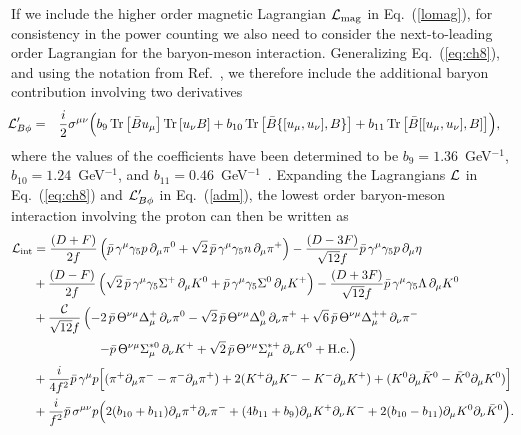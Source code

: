 \documentclass[preprintnumbers,prd,superscriptaddress,preprint]{revtex4-1}
\begin{document}
If we include the higher order magnetic Lagrangian ${\cal L}_{\rm mag}$ in Eq.~(\ref{lomag}), for consistency in the power counting we also need to consider the next-to-leading order Lagrangian for the baryon-meson interaction.
Generalizing Eq.~(\ref{eq:ch8}), and using the notation from Ref.~\cite{Kubis:2000aa}, we therefore include the additional baryon contribution involving two derivatives~\cite{Kubis:2000aa}
%
\begin{eqnarray}
\label{adm}
\!\!{\cal L}_{B\phi}' &=& \frac{i}{2}\sigma^{\mu\nu} 
\Big( 
  b_9\, {\rm Tr} \left[\bar{B}u_\mu\right]{\rm Tr}\left[u_\nu B\right]
+ b_{10}\, {\rm Tr} \left[\bar{B}\{[u_\mu,u_\nu],B\}\right]
+ b_{11}\, {\rm Tr} \left[\bar{B}[[u_\mu,u_\nu],B]\right]\!
\Big),~~~
\end{eqnarray}
%
where the values of the coefficients have been determined to be
    $b_9=1.36$~GeV$^{-1}$,
    $b_{10}=1.24$~GeV$^{-1}$,
and
    $b_{11}=0.46$~GeV$^{-1}$~\cite{Kubis:2000aa}.
%
Expanding the Lagrangians $\cal L$ in Eq.~(\ref{eq:ch8}) and ${\cal L}_{B\phi}'$ in Eq.~(\ref{adm}), the lowest order baryon-meson interaction involving the proton can then be written as
%
\begin{equation}
\begin{split}
{\cal L}_{\rm int}
&
= \frac{(D+F)}{2f}
  \left( \bar p\, \gamma^\mu \gamma_5 p\, \partial_\mu \pi^0
       + \sqrt2\, \bar p\, \gamma^\mu \gamma_5 n\, \partial_\mu \pi^+
  \right)
- \frac{(D-3F)}{\sqrt{12} f}
  \bar p\, \gamma^\mu \gamma_5 p\, \partial_\mu \eta        \\
&
+ \frac{(D-F)}{2 f}
  \left( \sqrt2\, \bar p\, \gamma^\mu \gamma_5 \Sigma^+\, \partial_\mu K^0
       + \bar p\, \gamma^\mu \gamma_5 \Sigma^0\, \partial_\mu K^+
  \right)                                                   
- \frac{(D+3F)}{\sqrt{12} f}
  \bar p\, \gamma^\mu \gamma_5 \Lambda\, \partial_\mu K^0   \\
&
+ \frac{\cal C}{\sqrt{12} f}
  \left(
  - 2\, \bar p\, \Theta^{\nu\mu} \Delta_\mu^+\, \partial_\nu \pi^0
  - \sqrt2\, \bar p\, \Theta^{\nu\mu} \Delta_\mu^0\, \partial_\nu \pi^+
  + \sqrt6\, \bar p\, \Theta^{\nu\mu} \Delta_\mu^{++}\, \partial_\nu \pi^-
  \right.							\\
&
  \hspace*{1.8cm}
  \left.
  - \bar p\, \Theta^{\nu\mu} \Sigma_\mu^{*0}\, \partial_\nu K^+
  + \sqrt2\, \bar p\, \Theta^{\nu\mu} \Sigma_\mu^{*+}\, \partial_\nu K^0
  + {\rm H.c.}
  \right)							\\
&
+ \frac{i}{4f^2} \bar p\, \gamma^\mu p
  \Big[
    (\pi^+ \partial_\mu \pi^-  -  \pi^- \partial_\mu \pi^+)
    + 2 (K^+ \partial_\mu K^-  -  K^- \partial_\mu K^+)
    + (K^0 \partial_\mu \bar K^0  -  \bar K^0 \partial_\mu K^0)
  \Big]   \\
&
+ \frac{i}{f^2} \bar p\, \sigma^{\mu\nu} p
  \Big( 2(b_{10}+b_{11})
    \partial_\mu\pi^+ \partial_\nu \pi^-
    + (4b_{11}+b_9) \partial_\mu K^+ \partial_\nu K^-  
    + 2(b_{10}-{b_{11}}) \partial_\mu K^0 \partial_\nu \bar K^0 
  \Big).
\end{split}
\label{eq:j1}
\end{equation}
\end{document}
